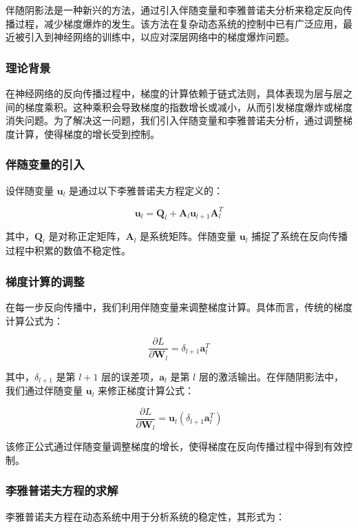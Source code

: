\documentclass[12pt,a4paper]{amsart}
\begin{document}
伴随阴影法是一种新兴的方法，通过引入伴随变量和李雅普诺夫分析来稳定反向传播过程，减少梯度爆炸的发生。该方法在复杂动态系统的控制中已有广泛应用，最近被引入到神经网络的训练中，以应对深层网络中的梯度爆炸问题。

\subsubsection{理论背景}

在神经网络的反向传播过程中，梯度的计算依赖于链式法则，具体表现为层与层之间的梯度乘积。这种乘积会导致梯度的指数增长或减小，从而引发梯度爆炸或梯度消失问题。为了解决这一问题，我们引入伴随变量和李雅普诺夫分析，通过调整梯度计算，使得梯度的增长受到控制。

\subsubsection{伴随变量的引入}

设伴随变量 \( \mathbf{u}_l \) 是通过以下李雅普诺夫方程定义的：

\[ \mathbf{u}_l = \mathbf{Q}_l + \mathbf{A}_l \mathbf{u}_{l+1} \mathbf{A}_l^T \]

其中，\( \mathbf{Q}_l \) 是对称正定矩阵，\( \mathbf{A}_l \) 是系统矩阵。伴随变量 \( \mathbf{u}_l \) 捕捉了系统在反向传播过程中积累的数值不稳定性。

\subsubsection{梯度计算的调整}

在每一步反向传播中，我们利用伴随变量来调整梯度计算。具体而言，传统的梯度计算公式为：

\[ \frac{\partial L}{\partial \mathbf{W}_l} = \delta_{l+1} \mathbf{a}_l^T \]

其中，\( \delta_{l+1} \) 是第 \( l+1 \) 层的误差项，\( \mathbf{a}_l \) 是第 \( l \) 层的激活输出。在伴随阴影法中，我们通过伴随变量 \( \mathbf{u}_l \) 来修正梯度计算公式：

\[ \frac{\partial L}{\partial \mathbf{W}_l} = \mathbf{u}_l (\delta_{l+1} \mathbf{a}_l^T) \]

该修正公式通过伴随变量调整梯度的增长，使得梯度在反向传播过程中得到有效控制。

\subsubsection{李雅普诺夫方程的求解}

李雅普诺夫方程在动态系统中用于分析系统的稳定性，其形式为：
\end{document}

